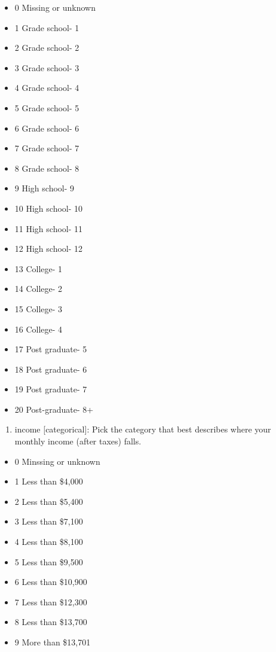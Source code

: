 \documentclass[
  letterpaper,
  DIV=11,
  numbers=noendperiod]{scrreprt}
\providecommand{\tightlist}{%
  \setlength{\itemsep}{0pt}\setlength{\parskip}{0pt}}\usepackage{longtable,booktabs,array}
\begin{document}
\begin{itemize}
\tightlist
\item
  0 Missing or unknown
\item
  1 Grade school- 1
\item
  2 Grade school- 2
\item
  3 Grade school- 3
\item
  4 Grade school- 4
\item
  5 Grade school- 5
\item
  6 Grade school- 6
\item
  7 Grade school- 7
\item
  8 Grade school- 8
\item
  9 High school- 9
\item
  10 High school- 10
\item
  11 High school- 11
\item
  12 High school- 12
\item
  13 College- 1
\item
  14 College- 2
\item
  15 College- 3
\item
  16 College- 4
\item
  17 Post graduate- 5
\item
  18 Post graduate- 6
\item
  19 Post graduate- 7
\item
  20 Post-graduate- 8+
\end{itemize}

\begin{enumerate}
\def\labelenumi{\arabic{enumi}.}
\setcounter{enumi}{15}
\tightlist
\item
  income {[}categorical{]}: Pick the category that best describes where
  your monthly income (after taxes) falls.
\end{enumerate}

\begin{itemize}
\tightlist
\item
  0 Minssing or unknown
\item
  1 Less than \$4,000
\item
  2 Less than \$5,400
\item
  3 Less than \$7,100
\item
  4 Less than \$8,100
\item
  5 Less than \$9,500
\item
  6 Less than \$10,900
\item
  7 Less than \$12,300
\item
  8 Less than \$13,700
\item
  9 More than \$13,701
\end{itemize}
\end{document}
